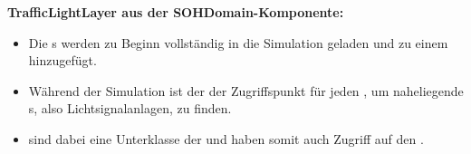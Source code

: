 \textbf{TrafficLightLayer aus der SOHDomain-Komponente:}
\begin{itemize}
    \item Die s werden zu Beginn vollständig in die Simulation geladen und zu einem  hinzugefügt.
    \item Während der Simulation ist der  der Zugriffspunkt für jeden , um naheliegende s, also Lichtsignalanlagen, zu finden.
    \item {} sind dabei eine Unterklasse der  und haben somit auch Zugriff auf den .
\end{itemize}
